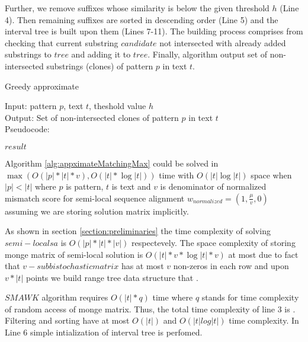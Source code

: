 Further, we remove suffixes whose similarity is below the given threshold $h$ (Line 4).
Then remaining suffixes are sorted in descending order (Line 5) and the interval tree is built upon them (Lines 7-11).
The building process comprises from checking that current substring $candidate$ not intersected with already added substrings to $tree$ and adding it to $tree$.
Finally, algorithm output set of non-intersected substrings (clones) of pattern $p$ in text $t$.


\begin{algorithm}[H]
\caption{Greedy approximate}
\label{alg:appximateMatchingMax}
Input: pattern $p$, text $t$, theshold value $h$\\
Output: Set of non-intersected clones of pattern $p$ in text $t$\\
Pseudocode:
\begin{algorithmic}[1]

\ENDIF
\ENDFOR
{}
\RETURN $result$
\end{algorithmic}
\end{algorithm}

\begin{theorem}
Algorithm \ref{alg:appximateMatchingMax} could  be solved in 
$\max ( O(|p| * |t| * v), O(|t| * \log |t|))$ time with $ O(|t| \log |t|)$ space when $|p|<|t|$ where $p$ is pattern, $t$ is text and $v$ is denominator of normalized mismatch score for semi-local sequence alignment
$w_{normalized} = (1,\frac{\mu}{v},0)$ assuming we are storing solution matrix implicitly.

As shown in section \ref{section:preliminaries} the time complexity 
of solving $semi-local sa$ is $O(|p|*|t|*|v|)$ respectevely.
The space complexity of storing monge matrix of semi-local solution is
$O(|t| * v * \log {|t| * v })$ at most due to fact that $v-subbistochastic matrix$ has at most $v$ non-zeros in each row and upon $v * |t|$ points we 
build range tree data structure that .

$SMAWK$ algorithm requires $O(|t|*q)$ time where $q$ stands for time complexity of  random access of monge matrix.
Thus, the  total time complexity of line 3 is .
Filtering and sorting have at most $O(|t|)$ and $O(|t|log|t|)$ time complexity.
In Line 6 simple intialization of interval tree is perfomed.   
 
 

\end{theorem}


